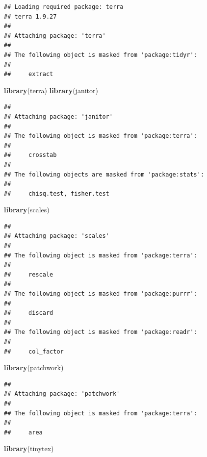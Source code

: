 \documentclass[
]{article}
\newenvironment{Shaded}{\begin{snugshade}}{\end{snugshade}}
\newcommand{\FunctionTok}[1]{\textcolor[rgb]{0.13,0.29,0.53}{\textbf{#1}}}
\newcommand{\NormalTok}[1]{#1}
\begin{document}
\begin{verbatim}
## Loading required package: terra
## terra 1.9.27
## 
## Attaching package: 'terra'
## 
## The following object is masked from 'package:tidyr':
## 
##     extract
\end{verbatim}

\begin{Shaded}
\begin{Highlighting}[]
\FunctionTok{library}\NormalTok{(terra)}
\FunctionTok{library}\NormalTok{(janitor)}
\end{Highlighting}
\end{Shaded}

\begin{verbatim}
## 
## Attaching package: 'janitor'
## 
## The following object is masked from 'package:terra':
## 
##     crosstab
## 
## The following objects are masked from 'package:stats':
## 
##     chisq.test, fisher.test
\end{verbatim}

\begin{Shaded}
\begin{Highlighting}[]
\FunctionTok{library}\NormalTok{(scales)}
\end{Highlighting}
\end{Shaded}

\begin{verbatim}
## 
## Attaching package: 'scales'
## 
## The following object is masked from 'package:terra':
## 
##     rescale
## 
## The following object is masked from 'package:purrr':
## 
##     discard
## 
## The following object is masked from 'package:readr':
## 
##     col_factor
\end{verbatim}

\begin{Shaded}
\begin{Highlighting}[]
\FunctionTok{library}\NormalTok{(patchwork)}
\end{Highlighting}
\end{Shaded}

\begin{verbatim}
## 
## Attaching package: 'patchwork'
## 
## The following object is masked from 'package:terra':
## 
##     area
\end{verbatim}

\begin{Shaded}
\begin{Highlighting}[]
\FunctionTok{library}\NormalTok{(tinytex)}
\end{Highlighting}
\end{Shaded}
\end{document}
